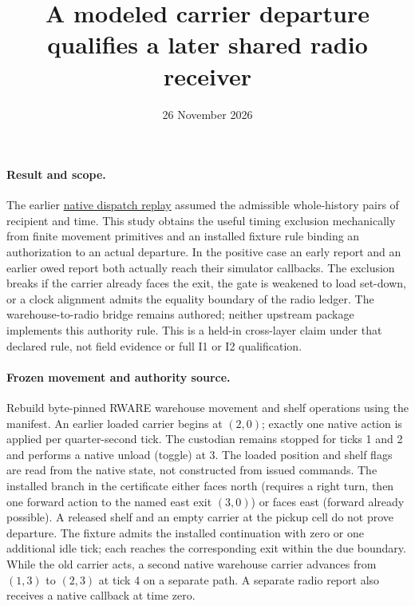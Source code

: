 \documentclass{article}
\title{A modeled carrier departure qualifies a later shared radio receiver}
\date{26 November 2026}
\begin{document}
\maketitle
\paragraph{Result and scope.}
The earlier \href{https://github.com/eternal-november/eos-research-programmes/pull/624}{native dispatch replay}
assumed the admissible whole-history pairs of recipient and time.
This study obtains the useful timing exclusion mechanically from
finite movement primitives and an installed fixture rule binding
an authorization to an actual departure. In the positive case an
early report and an earlier owed report both actually reach their
simulator callbacks. The exclusion breaks if the carrier already
faces the exit, the gate is weakened to load set-down, or a clock
alignment admits the equality boundary of the radio ledger.
The warehouse-to-radio bridge remains authored; neither upstream
package implements this authority rule. This is a held-in
cross-layer claim under that declared rule, not field evidence or
full I1 or I2 qualification.

\paragraph{Frozen movement and authority source.}
Rebuild byte-pinned RWARE warehouse movement and shelf operations
using the manifest. An earlier loaded carrier begins at \((2,0)\);
exactly one native action is applied per quarter-second tick.
The custodian remains stopped for ticks 1 and 2 and performs a
native unload (toggle) at 3. The loaded position and shelf flags are
read from the native state, not constructed from issued commands.
The installed branch in the certificate either faces north
(requires a right turn, then one forward action to the named
east exit \((3,0)\)) or faces east (forward already possible).
A released shelf and an empty carrier at the pickup cell do not
prove departure. The fixture admits the installed continuation with
zero or one additional idle tick; each reaches the corresponding
exit within the due boundary. While the old carrier acts, a
second native warehouse carrier advances from \((1,3)\) to
\((2,3)\) at tick 4 on a separate path. A separate radio report
also receives a native callback at time zero.
\end{document}
